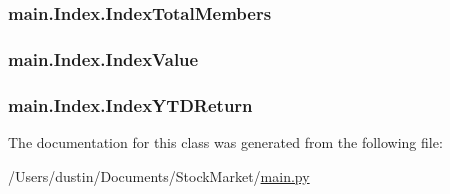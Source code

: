 \subsubsection[{Index\+Total\+Members}]{\setlength{\rightskip}{0pt plus 5cm}main.\+Index.\+Index\+Total\+Members}\label{classmain_1_1_index_a83501b0761a15fa4a3ca1e39d107a5b8}
\hypertarget{classmain_1_1_index_a0ed012594448b6c4c87efa3d6c9c2eb3}{}
\subsubsection[{Index\+Value}]{\setlength{\rightskip}{0pt plus 5cm}main.\+Index.\+Index\+Value}\label{classmain_1_1_index_a0ed012594448b6c4c87efa3d6c9c2eb3}
\hypertarget{classmain_1_1_index_a1178add897f1f01b5add7150da939ba2}{}
\subsubsection[{Index\+Y\+T\+D\+Return}]{\setlength{\rightskip}{0pt plus 5cm}main.\+Index.\+Index\+Y\+T\+D\+Return}\label{classmain_1_1_index_a1178add897f1f01b5add7150da939ba2}


The documentation for this class was generated from the following file\+:\begin{DoxyCompactItemize}
\item 
/\+Users/dustin/\+Documents/\+Stock\+Market/\hyperlink{main_8py}{main.\+py}\end{DoxyCompactItemize}
